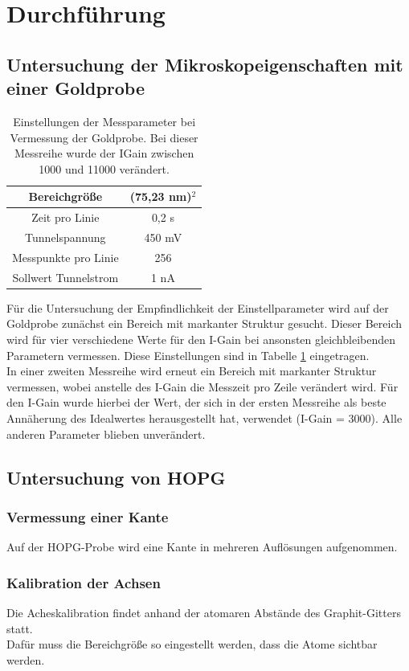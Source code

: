 \documentclass[12pt,a4paper]{article}
\begin{document}
\section{Durchführung}
\subsection{Untersuchung der Mikroskopeigenschaften mit einer Goldprobe}

\begin{table}
\centering
\begin{tabular}{|c|c|}
\hline 
Bereichgröße & (75,23 nm)$^2$ \\ 
\hline 
Zeit pro Linie & 0,2 s \\
\hline 
Tunnelspannung & 450 mV \\ 
\hline 
Messpunkte pro Linie & 256 \\
\hline 
Sollwert Tunnelstrom & 1 nA \\
\hline 
\end{tabular} 
\caption{Einstellungen der Messparameter bei Vermessung der Goldprobe. Bei dieser Messreihe wurde der IGain zwischen 1000 und 11000 verändert.}
\label{tab:IGain_Einstellungen}
\end{table}

Für die Untersuchung der Empfindlichkeit der Einstellparameter wird auf der Goldprobe zunächst ein Bereich mit markanter Struktur gesucht. Dieser Bereich wird für vier verschiedene Werte für den I-Gain bei ansonsten gleichbleibenden Parametern vermessen. Diese Einstellungen sind in Tabelle \ref{tab:IGain_Einstellungen} eingetragen.\\
In einer zweiten Messreihe wird erneut ein Bereich mit markanter Struktur vermessen, wobei anstelle des I-Gain die Messzeit pro Zeile verändert wird. Für den I-Gain wurde hierbei der Wert, der sich in der ersten Messreihe als beste Annäherung des Idealwertes herausgestellt hat, verwendet (I-Gain = 3000). Alle anderen Parameter blieben unverändert.

\subsection{Untersuchung von HOPG}
\subsubsection{Vermessung einer Kante}
Auf der HOPG-Probe wird eine Kante in mehreren Auflösungen aufgenommen.

\subsubsection{Kalibration der Achsen}
Die Acheskalibration findet anhand der atomaren Abstände des Graphit-Gitters statt.\\
Dafür muss die Bereichgröße so eingestellt werden, dass die Atome sichtbar werden.
\end{document}
